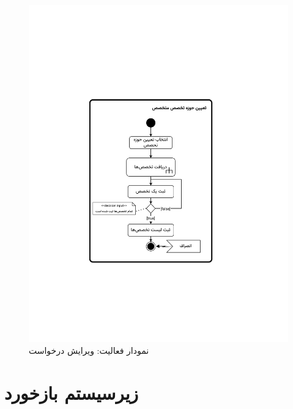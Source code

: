 \begin{figure}[ht!]
	\centering
	\includegraphics[scale=0.8, page=5]{figs/OOD-activity21-30.pdf}
	\caption{نمودار فعالیت: ویرایش درخواست}
\end{figure}
\FloatBarrier
\newpage


\section{زیرسیستم بازخورد}


